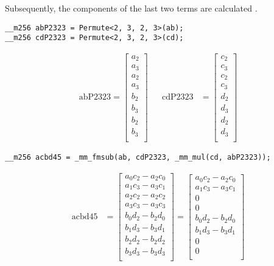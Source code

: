 Subsequently, the components of the last two terms are calculated .

\begin{verbatim}
__m256 abP2323 = Permute<2, 3, 2, 3>(ab);
__m256 cdP2323 = Permute<2, 3, 2, 3>(cd);
\end{verbatim}
\begin{align*}
\mathrm{abP2323} 
=
\begin{bmatrix}
a_2\\
a_3\\
a_2\\
a_3\\
b_2\\
b_3\\
b_2\\
b_3\\
\end{bmatrix}
&&
\mathrm{cdP2323} 
&=
\begin{bmatrix}
c_2\\
c_3\\
c_2\\
c_3\\
d_2\\
d_3\\
d_2\\
d_3\\
\end{bmatrix}
\end{align*}


\begin{verbatim}
__m256 acbd45 = _mm_fmsub(ab, cdP2323, _mm_mul(cd, abP2323));
\end{verbatim}
\begin{align*}
\mathrm{acbd45} 
&=
\begin{bmatrix}
a_0c_2 - a_2c_0\\
a_1c_3 - a_3c_1\\
a_2c_2 - a_2c_2\\
a_3c_3 - a_3c_3\\
b_0d_2 - b_2d_0\\
b_1d_3 - b_3d_1\\
b_2d_2 - b_2d_2\\
b_3d_3 - b_3d_3\\
\end{bmatrix}
=
\begin{bmatrix}
a_0c_2 - a_2c_0\\
a_1c_3 - a_3c_1\\
0\\
0\\
b_0d_2 - b_2d_0\\
b_1d_3 - b_3d_1\\
0\\
0\\
\end{bmatrix}
\end{align*}

